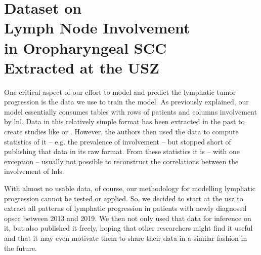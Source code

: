 \documentclass[\relativeRoot/main.tex]{subfiles}
\begin{document}
\chapter[
    USZ Dataset on Lymph Node Involvement in OPSCC
]{
    Dataset on\\Lymph Node Involvement\\in Oropharyngeal SCC\\Extracted at the USZ
}
\label{chap:dataset_usz}


\clearpage

One critical aspect of our effort to model and predict the lymphatic tumor progression is the data we use to train the model. As previously explained, our model essentially consumes tables with rows of patients and columns involvement by \gls{lnl}. Data in this relatively simple format has been extracted in the past to create studies like \cite{candela_patterns_1990} or \cite{shah_patterns_1990}. However, the authors then used the data to compute statistics of it -- e.g. the prevalence of involvement -- but stopped short of publishing that data in its raw format. From these statistics it is -- with one exception \cite{sanguineti_defining_2009} -- usually not possible to reconstruct the correlations between the involvement of \glspl{lnl}.

With almost no usable data, of course, our methodology for modelling lymphatic progression cannot be tested or applied. So, we decided to start at the \gls{usz} to extract all patterns of lymphatic progression in patients with newly diagnosed \gls{opscc} between 2013 and 2019. We then not only used that data for inference on it, but also published it freely, hoping that other researchers might find it useful and that it may even motivate them to share their data in a similar fashion in the future.






\end{document}

